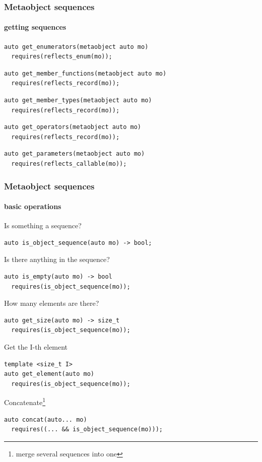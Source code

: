 \documentclass[compress,table,xcolor=table]{beamer}
\begin{document}
\begin{frame}[fragile]
  \frametitle{Metaobject sequences}
  \framesubtitle{getting sequences}
  \begin{lstlisting}[language=c++2x,basicstyle=\small\ttfamily]
auto get_enumerators(metaobject auto mo)
  requires(reflects_enum(mo));
  \end{lstlisting}
  \vfill
  \begin{lstlisting}[language=c++2x,basicstyle=\small\ttfamily]
auto get_member_functions(metaobject auto mo)
  requires(reflects_record(mo));
  \end{lstlisting}
  \vfill
  \begin{lstlisting}[language=c++2x,basicstyle=\small\ttfamily]
auto get_member_types(metaobject auto mo)
  requires(reflects_record(mo));
  \end{lstlisting}
  \vfill
  \begin{lstlisting}[language=c++2x,basicstyle=\small\ttfamily]
auto get_operators(metaobject auto mo)
  requires(reflects_record(mo));
  \end{lstlisting}
  \vfill
  \begin{lstlisting}[language=c++2x,basicstyle=\small\ttfamily]
auto get_parameters(metaobject auto mo)
  requires(reflects_callable(mo));
  \end{lstlisting}
\end{frame}
\begin{frame}[fragile]
  \frametitle{Metaobject sequences}
  \framesubtitle{basic operations}
  \smaller
  Is something a sequence?
  \begin{lstlisting}[language=c++2x,basicstyle=\small\ttfamily]
auto is_object_sequence(auto mo) -> bool;
  \end{lstlisting}
  \vfill
  Is there anything in the sequence?
  \begin{lstlisting}[language=c++2x,basicstyle=\footnotesize\ttfamily]
auto is_empty(auto mo) -> bool
  requires(is_object_sequence(mo));
  \end{lstlisting}
  \vfill
  How many elements are there?
  \begin{lstlisting}[language=c++2x,basicstyle=\footnotesize\ttfamily]
auto get_size(auto mo) -> size_t
  requires(is_object_sequence(mo));
  \end{lstlisting}
  \vfill
  Get the I-th element 
  \begin{lstlisting}[language=c++2x,basicstyle=\footnotesize\ttfamily]
template <size_t I>
auto get_element(auto mo)
  requires(is_object_sequence(mo));
  \end{lstlisting}
  \vfill
  Concatenate\footnote{merge several sequences into one}
  \begin{lstlisting}[language=c++2x,basicstyle=\footnotesize\ttfamily]
auto concat(auto... mo)
  requires((... && is_object_sequence(mo)));
  \end{lstlisting}
\end{frame}
\end{document}
